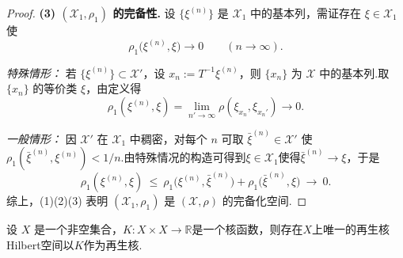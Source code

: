 \documentclass[../master.tex]{subfiles}
\begin{document}
\begin{proof}
\textbf{(3) $(\mathcal X_1,\rho_1)$ 的完备性.}
设 $\{\xi^{(n)}\}$ 是 $\mathcal X_1$ 中的基本列，需证存在 $\xi\in\mathcal X_1$ 使
\[
\rho_1\big(\xi^{(n)},\xi\big)\to 0\qquad (n\to\infty).
\]

\emph{特殊情形：} 若 $\{\xi^{(n)}\}\subset \mathcal X'$，设 $x_n:=T^{-1}\xi^{(n)}$，则 $\{x_n\}$ 为 $\mathcal X$ 中的基本列.取
$\{x_n\}$ 的等价类 $\xi$，由定义得 
\begin{equation*}
    \rho_1(\xi^{(n)},\xi)=\lim_{n'\to\infty}\rho(\xi_{x_n},\xi_{x_n'})\to 0.
\end{equation*}

\emph{一般情形：} 因 $\mathcal X'$ 在 $\mathcal X_1$ 中稠密，对每个 $n$ 可取
$\bar\xi^{(n)}\in\mathcal X'$ 使 $\rho_1(\bar\xi^{(n)},\xi^{(n)})<1/n$.由特殊情况的构造可得到$\xi\in \mathcal{X}_1$使得$\bar\xi^{(n)}\to \xi$，于是
\[
\rho_1(\xi^{(n)},\xi)\ \le\ \rho_1\big(\xi^{(n)},\bar\xi^{(n)}\big)+\rho_1\big(\bar\xi^{(n)},\xi\big)\ \longrightarrow\ 0.
\]
综上，(1)(2)(3) 表明 $(\mathcal X_1,\rho_1)$ 是 $(\mathcal X,\rho)$ 的完备化空间.
\end{proof}








\begin{theorem}\label{thm:Moore-Aronszajn}
    设 $X$ 是一个非空集合，$K:X\times X\to \mathbb{R}$是一个核函数，则存在$X$上唯一的再生核Hilbert空间以$K$作为再生核.
\end{theorem}
\end{document}
